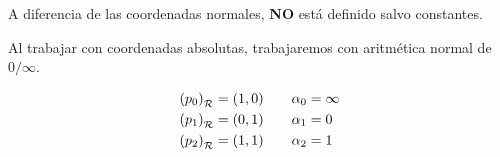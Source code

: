 \begin{obs}
  A diferencia de las coordenadas normales, \textbf{NO} está definido salvo constantes.
\end{obs}
\begin{obs}
  Al trabajar con coordenadas absolutas, trabajaremos con aritmética normal de $0/\infty$.
\end{obs}
\begin{obs}
  \[
    \begin{aligned}
      \left( p_0 \right)_{\mathcal{R}} = (1,0) &\qquad \alpha_0 = \infty \\
      \left( p_1 \right)_{\mathcal{R}} = (0,1) &\qquad \alpha_1 = 0 \\
      \left( p_2 \right)_{\mathcal{R}} = (1,1) &\qquad \alpha_2 = 1 \\
    \end{aligned}
  \]
\end{obs}

